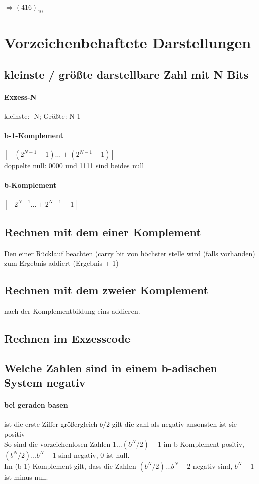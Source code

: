 \documentclass[a4paper]{article}
\begin{document}
$ \Rightarrow (416)_{10} $

\section{Vorzeichenbehaftete Darstellungen}
\subsection{kleinste / größte darstellbare Zahl mit N Bits}
\paragraph{Exzess-N}
kleinste: -N; Größte: N-1
\paragraph{b-1-Komplement}
$[ -(2^{N-1}-1) … +(2^{N-1}-1)]$\\
doppelte null: 0000 und 1111 sind beides null
\paragraph{b-Komplement}
$[ - 2^{N-1} … +2^{N-1} - 1]$

\subsection{Rechnen mit dem einer Komplement}
Den einer Rücklauf beachten (carry bit von höchster stelle wird (falls vorhanden) zum Ergebnis addiert (Ergebnis + 1)
\subsection{Rechnen mit dem zweier Komplement}
nach der Komplementbildung eins addieren.
\subsection{Rechnen im Exzesscode}

\subsection{Welche Zahlen sind in einem b-adischen System negativ}
\paragraph{bei geraden basen} ist die erste Ziffer größergleich $ b / 2 $ gilt die zahl als negativ ansonsten ist sie positiv \\
So sind die vorzeichenlosen Zahlen $1 … (b^N/2)-1$ im b-Komplement positiv, $(b^N/2) … b^N-1$ sind negativ, $0$ ist null.\\
Im (b-1)-Komplement gilt, dass die Zahlen $(b^N/2) … b^N-2$ negativ sind, $b^N-1$ ist minus null.
\end{document}
